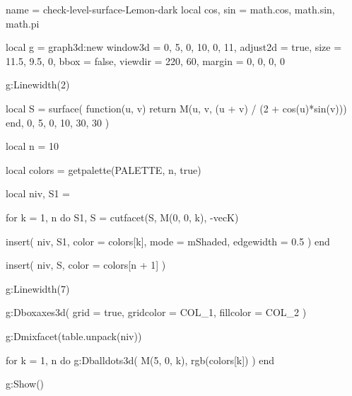 \documentclass[theme = dark]{tutodoc}
\newcommand{\PALETTE}{Lemon}
\begin{document}
\vfill

\begin{luadraw}{name = check-level-surface-\PALETTE-dark}
local cos, sin = math.cos, math.sin, math.pi

local g = graph3d:new{
  window3d = {0, 5, 0, 10, 0, 11},
  adjust2d = true,
  size     = {11.5, 9.5, 0},
  bbox     = false,
  viewdir  = {220, 60},
  margin   = {0, 0, 0, 0}
}

g:Linewidth(2)

local S = surface(
  function(u, v)
    return M(u, v, (u + v) / (2 + cos(u)*sin(v)))
  end,
  0, 5, 0, 10,
  {30, 30}
)

local n = 10

local colors = getpalette(PALETTE, n, true)

local niv, S1 = {}

for k = 1, n do
  S1, S = cutfacet(S, {M(0, 0, k), -vecK})

  insert(
    niv,
    {
      S1,
      {
        color     = colors[k],
        mode      = mShaded,
        edgewidth = 0.5
      }
    }
  )
end

insert(
  niv,
  {
    S,
    {color = colors[n + 1]}
  }
)

g:Linewidth(7)

g:Dboxaxes3d({
  grid      = true,
  gridcolor = COL_1,
  fillcolor = COL_2
})

g:Dmixfacet(table.unpack(niv))

for k = 1, n do
  g:Dballdots3d(
    M(5, 0, k),
    rgb(colors[k])
  )
end

g:Show()
\end{luadraw}
\end{document}
